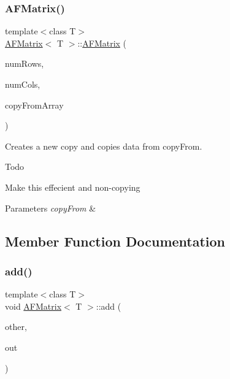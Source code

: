 \subsubsection{\texorpdfstring{A\+F\+Matrix()}{AFMatrix()}\hspace{0.1cm}{\footnotesize\ttfamily [2/2]}}
{\footnotesize\ttfamily template$<$class T$>$ \\
\hyperlink{classAFMatrix}{A\+F\+Matrix}$<$ T $>$\+::\hyperlink{classAFMatrix}{A\+F\+Matrix} (\begin{DoxyParamCaption}\item[{int}]{num\+Rows,  }\item[{int}]{num\+Cols,  }\item[{vector$<$ T $>$ $\ast$}]{copy\+From\+Array }\end{DoxyParamCaption})\hspace{0.3cm}{\ttfamily [inline]}}

Creates a new copy and copies data from {\ttfamily copy\+From}. \begin{DoxyRefDesc}{Todo}
\item[\hyperlink{todo__todo000003}{Todo}]Make this effecient and non-\/copying \end{DoxyRefDesc}

\begin{DoxyParams}{Parameters}
{\em copy\+From} & \\
\hline
\end{DoxyParams}


\subsection{Member Function Documentation}
\mbox{\label{classAFMatrix_a01822da7fbed75d3d21791e017e69d84}} 
\subsubsection{\texorpdfstring{add()}{add()}}
{\footnotesize\ttfamily template$<$class T$>$ \\
void \hyperlink{classAFMatrix}{A\+F\+Matrix}$<$ T $>$\+::add (\begin{DoxyParamCaption}\item[{\hyperlink{classAFMatrix}{A\+F\+Matrix}$<$ T $>$ $\ast$}]{other,  }\item[{\hyperlink{classAFMatrix}{A\+F\+Matrix}$<$ T $>$ $\ast$}]{out }\end{DoxyParamCaption})\hspace{0.3cm}{\ttfamily [inline]}}

